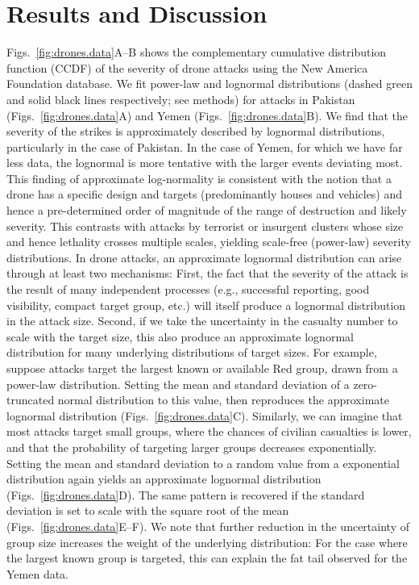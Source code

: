 \documentclass[preprint,12pt]{elsarticle}
\begin{document}
\section*{Results and Discussion}
Figs.~\ref{fig:drones.data}A--B shows the complementary cumulative distribution function 
(CCDF) of the severity of drone attacks using the New America Foundation
database. We fit power-law and lognormal 
distributions (dashed green and solid black lines respectively; see methods)
for attacks in Pakistan (Figs.~\ref{fig:drones.data}A) and 
Yemen (Figs.~\ref{fig:drones.data}B).
We find that the severity of the strikes is approximately described by lognormal
distributions, particularly in the case of Pakistan. In the case of Yemen, for which we have far less data, the lognormal is more tentative with the larger events deviating most. This finding of approximate log-normality is
consistent with the notion that a drone has a specific design and targets (predominantly houses and vehicles) and hence a pre-determined order of magnitude of the range of
destruction and likely severity. This contrasts with attacks by terrorist or insurgent clusters whose size and hence lethality crosses multiple scales, yielding scale-free (power-law) severity distributions. In drone attacks, an approximate lognormal distribution can arise through at least two mechanisms: First, the fact that the severity of the attack is the result of many independent processes (e.g., successful reporting, good visibility, compact target group, etc.) will itself produce a lognormal distribution in the attack size. Second, if we take the uncertainty in the casualty number to scale with the target size, this also produce an approximate lognormal distribution for many underlying distributions of target sizes. For example, suppose attacks target the largest known or available Red group, drawn from a power-law distribution. Setting the mean and standard deviation of a zero-truncated normal distribution to this value, then reproduces the approximate lognormal distribution (Figs.~\ref{fig:drones.data}C). Similarly, we can imagine that most attacks target small groups, where the chances of civilian casualties is lower, and that the probability of targeting larger groups decreases exponentially. Setting the mean and standard deviation to a random value from a exponential distribution again yields an approximate lognormal distribution (Figs.~\ref{fig:drones.data}D). The same pattern is recovered if the standard deviation is set to scale with the square root of the mean (Figs.~\ref{fig:drones.data}E--F). We note that further reduction in the uncertainty of group size increases the weight of the underlying distribution: For the case where the largest known group is targeted, this can explain the fat tail observed for the Yemen data. 
\end{document}
